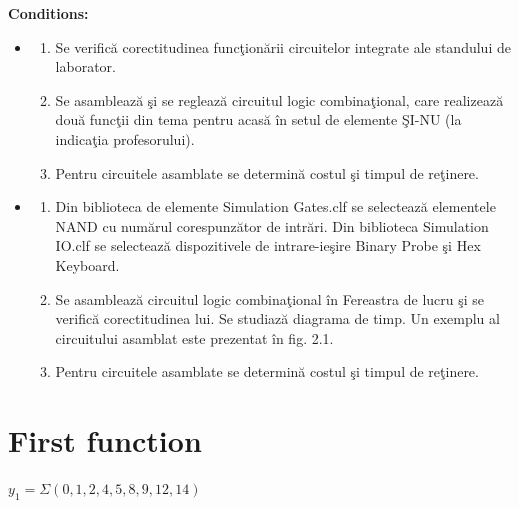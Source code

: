 \documentclass{article}
\begin{document}
	{\large \textbf{Conditions:}}
	\begin{itemize}
		\item \begin{enumerate}
			\item Se verifică  corectitudinea funcţionării circuitelor integrate ale standului de laborator.

			\item Se asamblează şi se reglează circuitul logic combinaţional, care realizează două funcţii din tema pentru acasă în setul de elemente ŞI-NU (la indicaţia profesorului).

			\item Pentru circuitele asamblate se determină costul şi timpul de reţinere.
		\end{enumerate}

		\item \begin{enumerate}
			\item Din biblioteca de elemente Simulation Gates.clf se selectează elementele NAND cu numărul corespunzător de intrări. Din biblioteca Simulation IO.clf se selectează dispozitivele de intrare-ieşire Binary Probe şi Hex Keyboard.

			\item Se asamblează circuitul logic combinaţional în Fereastra de lucru şi se verifică corectitudinea lui. Se studiază diagrama de timp. Un exemplu al circuitului asamblat este prezentat în fig. 2.1.

			\item Pentru circuitele asamblate se determină costul şi timpul de reţinere.
		\end{enumerate}
	\end{itemize}

	\newpage
	\section{First function} %
		\begin{center}
			$y_1 = \Sigma(0, 1, 2, 4, 5, 8, 9, 12, 14)$
		\end{center}

		\vspace{\fill}
\end{document}
